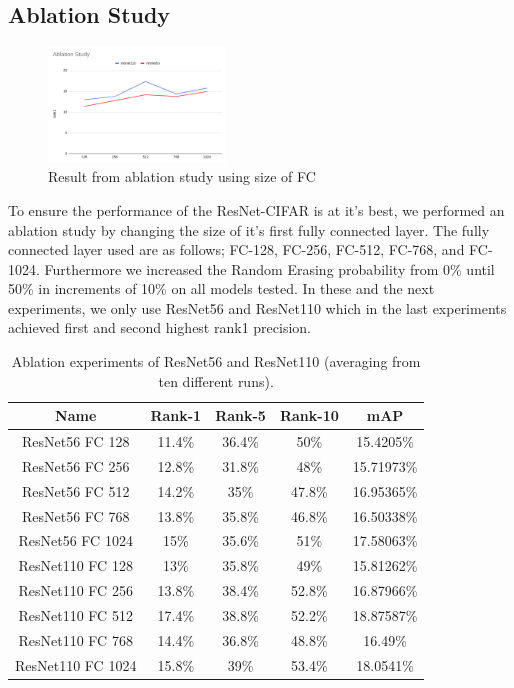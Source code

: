 \documentclass[conference]{IEEEtran}
\begin{document}
	\subsection{Ablation Study}
	\vspace{1ex}
	
	\begin{figure}[h!] \centering
		\includegraphics[width=0.42\textwidth]{img/ablation.png}
		\caption{Result from ablation study using size of FC}
		\label{fig:5}
	\end{figure}
	
	To ensure the performance of the ResNet-CIFAR is at it's best, we performed an ablation study by changing the size of it's first fully connected layer. The fully connected layer used are as follows; FC-128, FC-256, FC-512, FC-768, and FC-1024. Furthermore we increased the Random Erasing probability from 0\% until 50\% in increments of 10\% on all models tested. In these and the next experiments, we only use ResNet56 and ResNet110 which in the last experiments achieved first and second highest rank1 precision. 
	
	\begin{table}[h!]
		\begin{center}
			\begin{tabular}{|c|c|c|c|c|}
				\hline
				\textbf{Name} & \textbf{Rank-1} & \textbf{Rank-5} & \textbf{Rank-10} & \textbf{mAP} \\ \hline
				ResNet56 FC 128 & 11.4\% & 36.4\% & 50\% & 15.4205\%\\ \hline
				ResNet56 FC 256 & 12.8\% & 31.8\% & 48\% & 15.71973\%\\ \hline
				ResNet56 FC 512 & 14.2\% & 35\% & 47.8\% & 16.95365\%\\ \hline
				ResNet56 FC 768 & 13.8\% & 35.8\% & 46.8\% & 16.50338\%\\ \hline
				ResNet56 FC 1024 & 15\% & 35.6\% & 51\% & 17.58063\%\\ \hline
				ResNet110 FC 128 & 13\% & 35.8\% & 49\% & 15.81262\%\\ \hline
				ResNet110 FC 256 & 13.8\% & 38.4\% & 52.8\% & 16.87966\%\\ \hline
				ResNet110 FC 512 & 17.4\% & 38.8\% & 52.2\% & 18.87587\%\\ \hline
				ResNet110 FC 768 & 14.4\% & 36.8\% & 48.8\% & 16.49\%\\ \hline
				ResNet110 FC 1024 & 15.8\% & 39\% & 53.4\% & 18.0541\%\\ \hline
			\end{tabular}
		\end{center}
		\vspace{1ex}
		\caption{Ablation experiments of ResNet56 and ResNet110 (averaging from ten different runs).}
		\label{tabel:5}
	\end{table}
\end{document}
